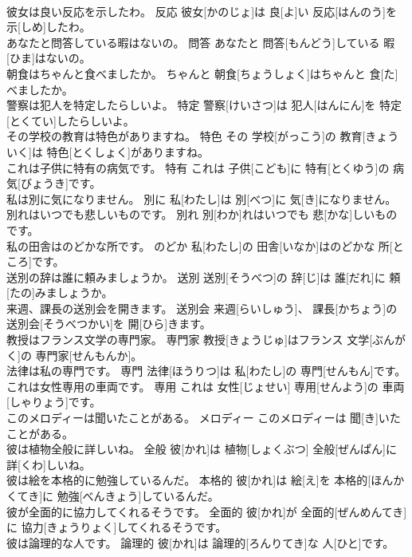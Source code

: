 \documentclass[8pt]{extreport}
\begin{document}
\begin{CJK}{UTF8}{min}
\\	彼女は良い反応を示したわ。	反応	彼女[かのじょ]は 良[よ]い 反応[はんのう]を 示[しめ]したわ。	
\\	あなたと問答している暇はないの。	問答	あなたと 問答[もんどう]している 暇[ひま]はないの。	
\\	朝食はちゃんと食べましたか。	ちゃんと	朝食[ちょうしょく]はちゃんと 食[た]べましたか。	
\\	警察は犯人を特定したらしいよ。	特定	警察[けいさつ]は 犯人[はんにん]を 特定[とくてい]したらしいよ。	
\\	その学校の教育は特色がありますね。	特色	その 学校[がっこう]の 教育[きょういく]は 特色[とくしょく]がありますね。	
\\	これは子供に特有の病気です。	特有	これは 子供[こども]に 特有[とくゆう]の 病気[びょうき]です。	
\\	私は別に気になりません。	別に	私[わたし]は 別[べつ]に 気[き]になりません。	
\\	別れはいつでも悲しいものです。	別れ	別[わか]れはいつでも 悲[かな]しいものです。	
\\	私の田舎はのどかな所です。	のどか	私[わたし]の 田舎[いなか]はのどかな 所[ところ]です。	
\\	送別の辞は誰に頼みましょうか。	送別	送別[そうべつ]の 辞[じ]は 誰[だれ]に 頼[たの]みましょうか。	
\\	来週、課長の送別会を開きます。	送別会	来週[らいしゅう]、 課長[かちょう]の 送別会[そうべつかい]を 開[ひら]きます。	
\\	教授はフランス文学の専門家。	専門家	教授[きょうじゅ]はフランス 文学[ぶんがく]の 専門家[せんもんか]。	
\\	法律は私の専門です。	専門	法律[ほうりつ]は 私[わたし]の 専門[せんもん]です。	
\\	これは女性専用の車両です。	専用	これは 女性[じょせい] 専用[せんよう]の 車両[しゃりょう]です。	
\\	このメロディーは聞いたことがある。	メロディー	このメロディーは 聞[き]いたことがある。	
\\	彼は植物全般に詳しいね。	全般	彼[かれ]は 植物[しょくぶつ] 全般[ぜんぱん]に 詳[くわ]しいね。	
\\	彼は絵を本格的に勉強しているんだ。	本格的	彼[かれ]は 絵[え]を 本格的[ほんかくてき]に 勉強[べんきょう]しているんだ。	
\\	彼が全面的に協力してくれるそうです。	全面的	彼[かれ]が 全面的[ぜんめんてき]に 協力[きょうりょく]してくれるそうです。	
\\	彼は論理的な人です。	論理的	彼[かれ]は 論理的[ろんりてき]な 人[ひと]です。	

\end{CJK}
\end{document}
